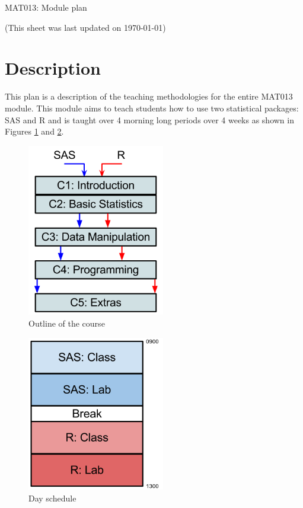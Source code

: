 \documentclass[a4paper,12pt]{article}
\begin{document}
\begin{center}
\huge{MAT013: Module plan}
\end{center}
\begin{center}
\tiny{(This sheet was last updated on \today)}
\end{center}

\section{Description}
This plan is a description of the teaching methodologies for the entire MAT013 module. This module aims to teach students how to use two statistical packages: SAS and R and is taught over 4 morning long periods over 4 weeks as shown in Figures \ref{chapter} and \ref{Days}.

\begin{figure}[htdp]
    \begin{center}
        \includegraphics[width=6cm]{images/chapters.png}
    \end{center}
    \caption{Outline of the course}
    \label{chapter}
\end{figure}

\begin{figure}[htdp]
    \begin{center}
        \includegraphics[width=6cm]{images/Days.png}
    \end{center}
    \caption{Day schedule}
    \label{Days}
\end{figure}
\end{document}
